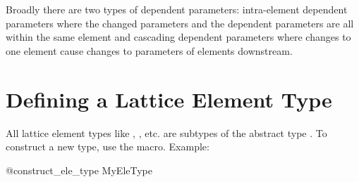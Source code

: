 Broadly there are two types of dependent parameters: intra-element dependent parameters where
the changed parameters and the dependent parameters are all within the same element and
cascading dependent parameters where changes to one element cause changes to parameters of 
elements downstream.



\section{Defining a Lattice Element Type}
\label{s:ele.type}

All lattice element types like , , etc. are subtypes of the abstract type
. To construct a new type, use the  macro. Example:
\begin{example}
  @construct_ele_type MyEleType
\end{example}
